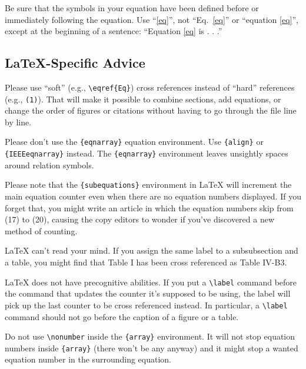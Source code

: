 \documentclass[
  twoside,
  openright,
  degree    = master,               %
  language  = english,              %
  fontset   = template,             %
  watermark = true,                 %
  doi       = true,                 %
]{ncs-ieee-conference}
\begin{document}
Be sure that the
symbols in your equation have been defined before or immediately following
the equation. Use ``\eqref{eq}'', not ``Eq.~\eqref{eq}'' or ``equation \eqref{eq}'', except at
the beginning of a sentence: ``Equation \eqref{eq} is . . .''

\subsection{\LaTeX-Specific Advice}

Please use ``soft'' (e.g., \verb|\eqref{Eq}|) cross references instead
of ``hard'' references (e.g., \verb|(1)|). That will make it possible
to combine sections, add equations, or change the order of figures or
citations without having to go through the file line by line.

Please don't use the \verb|{eqnarray}| equation environment. Use
\verb|{align}| or \verb|{IEEEeqnarray}| instead. The \verb|{eqnarray}|
environment leaves unsightly spaces around relation symbols.

Please note that the \verb|{subequations}| environment in {\LaTeX}
will increment the main equation counter even when there are no
equation numbers displayed. If you forget that, you might write an
article in which the equation numbers skip from (17) to (20), causing
the copy editors to wonder if you've discovered a new method of
counting.

  {\LaTeX} can't read your mind. If you assign the same label to a
subsubsection and a table, you might find that Table I has been cross
referenced as Table IV-B3.

{\LaTeX} does not have precognitive abilities. If you put a
\verb|\label| command before the command that updates the counter it's
supposed to be using, the label will pick up the last counter to be
cross referenced instead. In particular, a \verb|\label| command
should not go before the caption of a figure or a table.

Do not use \verb|\nonumber| inside the \verb|{array}| environment. It
will not stop equation numbers inside \verb|{array}| (there won't be
any anyway) and it might stop a wanted equation number in the
surrounding equation.
\end{document}
